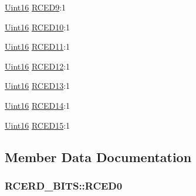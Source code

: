\begin{DoxyCompactItemize}
\item 
\hyperlink{_d_s_p2833x___device_8h_a59a9f6be4562c327cbfb4f7e8e18f08b}{Uint16} \hyperlink{struct_r_c_e_r_d___b_i_t_s_a4a7bc6db9f0e381fb8060cad8517358e}{R\+C\+E\+D9}\+:1
\item 
\hyperlink{_d_s_p2833x___device_8h_a59a9f6be4562c327cbfb4f7e8e18f08b}{Uint16} \hyperlink{struct_r_c_e_r_d___b_i_t_s_a3fdc14369c5845264dff9452be12e31e}{R\+C\+E\+D10}\+:1
\item 
\hyperlink{_d_s_p2833x___device_8h_a59a9f6be4562c327cbfb4f7e8e18f08b}{Uint16} \hyperlink{struct_r_c_e_r_d___b_i_t_s_a928eac0b43dd398b6e815eccafa708d2}{R\+C\+E\+D11}\+:1
\item 
\hyperlink{_d_s_p2833x___device_8h_a59a9f6be4562c327cbfb4f7e8e18f08b}{Uint16} \hyperlink{struct_r_c_e_r_d___b_i_t_s_aec8a4f3eef47d046cdfc656bc31e7dc0}{R\+C\+E\+D12}\+:1
\item 
\hyperlink{_d_s_p2833x___device_8h_a59a9f6be4562c327cbfb4f7e8e18f08b}{Uint16} \hyperlink{struct_r_c_e_r_d___b_i_t_s_abbdfaf778a14475e46535f7a656e37f4}{R\+C\+E\+D13}\+:1
\item 
\hyperlink{_d_s_p2833x___device_8h_a59a9f6be4562c327cbfb4f7e8e18f08b}{Uint16} \hyperlink{struct_r_c_e_r_d___b_i_t_s_a47ff50d3057974042cd9855de2e8e837}{R\+C\+E\+D14}\+:1
\item 
\hyperlink{_d_s_p2833x___device_8h_a59a9f6be4562c327cbfb4f7e8e18f08b}{Uint16} \hyperlink{struct_r_c_e_r_d___b_i_t_s_ace49bf1ca366f472d0e33c604f9287a7}{R\+C\+E\+D15}\+:1
\end{DoxyCompactItemize}


\subsection{Member Data Documentation}
\hypertarget{struct_r_c_e_r_d___b_i_t_s_a66f286b379bd7e100cd55ab6f83ec9d2}{}
\subsubsection[{R\+C\+E\+D0}]{ R\+C\+E\+R\+D\+\_\+\+B\+I\+T\+S\+::\+R\+C\+E\+D0}\label{struct_r_c_e_r_d___b_i_t_s_a66f286b379bd7e100cd55ab6f83ec9d2}
\hypertarget{struct_r_c_e_r_d___b_i_t_s_a02b411bb78f0d84f5d2c897b244a068d}{}
